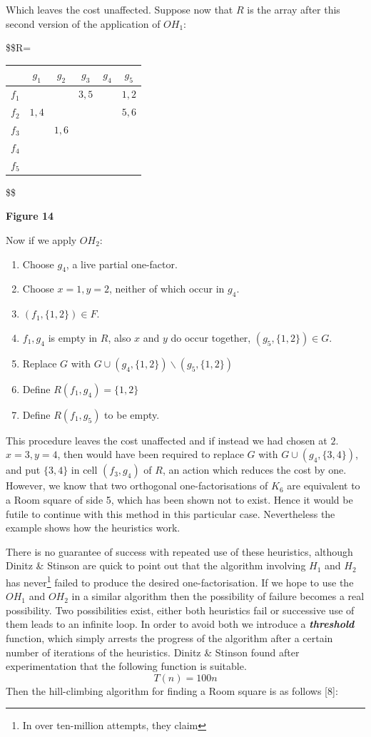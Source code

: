 \documentclass[
  12pt,
  a4paper]{book}
\begin{document}
Which leaves the cost unaffected. Suppose now that \(R\) is the array
after this second version of the application of \(OH_1\):

\$\$R=

\begin{longtable}[]{@{}lccccc@{}}
\toprule
& \(g_1\) & \(g_2\) & \(g_3\) & \(g_4\) & \(g_5\)\tabularnewline
\midrule
\endhead
\(f_1\) & & & \(3,5\) & & \(1,2\)\tabularnewline
\(f_2\) & \(1,4\) & & & & \(5,6\)\tabularnewline
\(f_3\) & & \(1,6\) & & &\tabularnewline
\(f_4\) & & & & &\tabularnewline
\(f_5\) & & & & &\tabularnewline
\bottomrule
\end{longtable}

\$\$

\textbf{Figure 14}

Now if we apply \(OH_2\):

\begin{enumerate}
\def\labelenumi{\arabic{enumi}.}
\item
  Choose \(g_4\), a live partial one-factor.
\item
  Choose \(x=1, y=2\), neither of which occur in \(g_4\).
\item
  \((f_1,\{1,2\}) \in F\).
\item
  \(f_1,g_4\) is empty in \(R\), also \(x\) and \(y\) do occur together,
  \((g_5,\{1,2\}) \in G\).
\item
  Replace \(G\) with \(G \cup (g_4,\{1,2\}) \backslash (g_5,\{1,2\})\)
\item
  Define \(R(f_1,g_4)=\{1,2\}\)
\item
  Define \(R(f_1,g_5)\) to be empty.
\end{enumerate}

This procedure leaves the cost unaffected and if instead we had chosen
at \(2\). \(x=3,y=4\), then would have been required to replace \(G\) with
\(G \cup (g_4,\{3,4\})\), and put \(\{3,4\}\) in cell \((f_3,g_4)\) of \(R\), an
action which reduces the cost by one. However, we know that two
orthogonal one-factorisations of \(K_6\) are equivalent to a Room square
of side 5, which has been shown not to exist. Hence it would be futile
to continue with this method in this particular case. Nevertheless the
example shows how the heuristics work.

There is no guarantee of success with repeated use of these heuristics,
although Dinitz \& Stinson are quick to point out that the algorithm
involving \(H_1\) and \(H_2\) has never\footnote{In over ten-million attempts, they claim} failed to produce the desired
one-factorisation. If we hope to use the \(OH_1\) and \(OH_2\) in a similar
algorithm then the possibility of failure becomes a real possibility.
Two possibilities exist, either both heuristics fail or successive use
of them leads to an infinite loop. In order to avoid both we introduce a
\textbf{\emph{threshold}} function, which simply arrests the progress of the
algorithm after a certain number of iterations of the heuristics. Dinitz
\& Stinson found after experimentation that the following function is
suitable. \[T(n)=100n\] Then the hill-climbing algorithm for finding a
Room square is as follows {[}8{]}:
\end{document}
